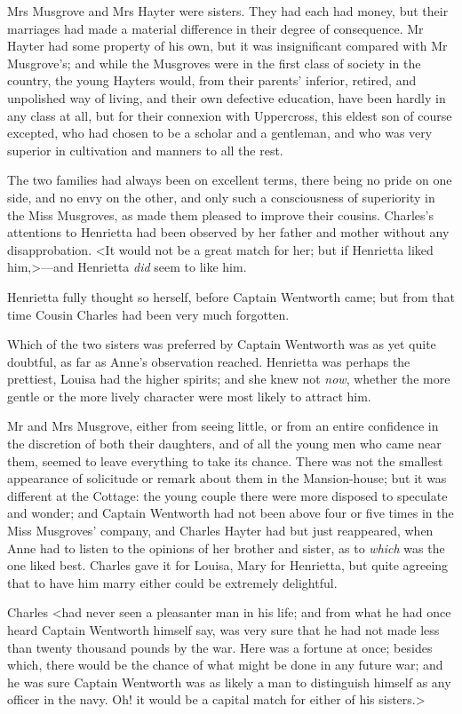 Mrs Musgrove and Mrs Hayter were sisters. They had each had money, but their marriages had made a material difference in their degree of consequence. Mr Hayter had some property of his own, but it was insignificant compared with Mr Musgrove's; and while the Musgroves were in the first class of society in the country, the young Hayters would, from their parents' inferior, retired, and unpolished way of living, and their own defective education, have been hardly in any class at all, but for their connexion with Uppercross, this eldest son of course excepted, who had chosen to be a scholar and a gentleman, and who was very superior in cultivation and manners to all the rest.

The two families had always been on excellent terms, there being no pride on one side, and no envy on the other, and only such a consciousness of superiority in the Miss Musgroves, as made them pleased to improve their cousins. Charles's attentions to Henrietta had been observed by her father and mother without any disapprobation. <It would not be a great match for her; but if Henrietta liked him,>—and Henrietta \textit{did} seem to like him.

Henrietta fully thought so herself, before Captain Wentworth came; but from that time Cousin Charles had been very much forgotten.

Which of the two sisters was preferred by Captain Wentworth was as yet quite doubtful, as far as Anne's observation reached. Henrietta was perhaps the prettiest, Louisa had the higher spirits; and she knew not \textit{now}, whether the more gentle or the more lively character were most likely to attract him.

Mr and Mrs Musgrove, either from seeing little, or from an entire confidence in the discretion of both their daughters, and of all the young men who came near them, seemed to leave everything to take its chance. There was not the smallest appearance of solicitude or remark about them in the Mansion-house; but it was different at the Cottage: the young couple there were more disposed to speculate and wonder; and Captain Wentworth had not been above four or five times in the Miss Musgroves' company, and Charles Hayter had but just reappeared, when Anne had to listen to the opinions of her brother and sister, as to \textit{which} was the one liked best. Charles gave it for Louisa, Mary for Henrietta, but quite agreeing that to have him marry either could be extremely delightful.

Charles <had never seen a pleasanter man in his life; and from what he had once heard Captain Wentworth himself say, was very sure that he had not made less than twenty thousand pounds by the war. Here was a fortune at once; besides which, there would be the chance of what might be done in any future war; and he was sure Captain Wentworth was as likely a man to distinguish himself as any officer in the navy. Oh! it would be a capital match for either of his sisters.>

